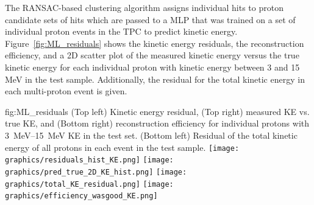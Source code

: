The RANSAC-based clustering algorithm assigns individual hits to proton candidate sets of hits which are
passed to a MLP that was trained on a set of individual proton events in the TPC to predict kinetic energy.  Figure~\ref{fig:ML_residuals} shows the kinetic energy residuals, the reconstruction efficiency,
and a 2D scatter plot of the measured kinetic energy versus the true kinetic energy
for each individual proton with kinetic energy between 3 and 15 MeV in the test sample.  Additionally, the residual for the total kinetic energy in each multi-proton event is given. 
%
%

\begin{dunefigure}{fig:ML_residuals}
{(Top left) Kinetic energy residual, (Top right) measured KE vs. true KE, and (Bottom right) reconstruction efficiency for individual protons with \SIrange{3}{15}{MeV} KE in the test set.  (Bottom left) Residual of the total kinetic energy of all protons in each event in the test sample.}
    \texttt{[image: graphics/residuals\_hist\_KE.png]}                                                    
    \texttt{[image: graphics/pred\_true\_2D\_KE\_hist.png]}
    \vspace{1mm}
    \texttt{[image: graphics/total\_KE\_residual.png]}
    \texttt{[image: graphics/efficiency\_wasgood\_KE.png]}
\end{dunefigure}
%
%


